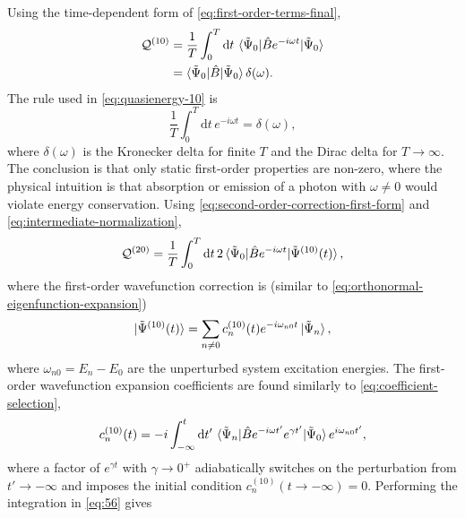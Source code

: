 \documentclass[%
class = book,%
crop = false,%
float = true,%
multi = true,%
preview = false,%
]{standalone}
\begin{document}
Using the time-dependent form of \eqref{eq:first-order-terms-final},
\begin{equation}
  \label{eq:quasienergy-10}
  \begin{aligned}
    \mathcal{Q}^{(10)} &= \frac{1}{T} \int_{0}^{T} \mathrm{d}t \, \braket{\tilde{\Psi}_{0}|\hat{B}e^{-i\omega t}|\tilde{\Psi}_{0}} \\
    &= \braket{\tilde{\Psi}_{0}|\hat{B}|\tilde{\Psi}_{0}} \delta(\omega).
\end{aligned}
\end{equation}
The rule used in \eqref{eq:quasienergy-10} is
\begin{equation}
  \label{eq:kronecker-delta-frequencies}
  \frac{1}{T} \int_{0}^{T} \mathrm{d}t \, e^{-i\omega t} = \delta(\omega),
\end{equation}
where \(\delta(\omega)\) is the Kronecker delta for finite \(T\) and the Dirac delta for \(T \rightarrow \infty\). The conclusion is that only static first-order properties are non-zero, where the physical intuition is that absorption or emission of a photon with \(\omega \neq 0\) would violate energy conservation. Using \eqref{eq:second-order-correction-first-form} and \eqref{eq:intermediate-normalization},
\begin{equation}
  \label{eq:quasienergy-20}
  \mathcal{Q}^{(20)} = \frac{1}{T} \int_{0}^{T} \mathrm{d}t \, 2\braket{\tilde{\Psi}_{0}|\hat{B}e^{-i\omega t}|\tilde{\Psi}^{(10)}(t)},
\end{equation}
where the first-order wavefunction correction is (similar to \eqref{eq:orthonormal-eigenfunction-expansion})
\begin{equation}
  \label{eq:first-order-wavefunction}
  \ket{\tilde{\Psi}^{(10)}(t)} = \sum_{n\neq 0} c_{n}^{(10)}(t) e^{-i\omega_{n0}t} \ket{\tilde{\Psi}_{n}},
\end{equation}
where \(\omega_{n0} = E_{n} - E_{0}\) are the unperturbed system excitation energies. The first-order wavefunction expansion coefficients are found similarly to \eqref{eq:coefficient-selection},
\begin{equation}
  \label{eq:56}
  c_{n}^{(10)}(t) = -i \int_{-\infty}^{t} \mathrm{d}t' \, \braket{\tilde{\Psi}_{n}|\hat{B}e^{-i\omega t'}e^{\gamma t'}|\tilde{\Psi}_{0}}e^{i\omega_{n0}t'},
\end{equation}
where a factor of \(e^{\gamma t}\) with \(\gamma \rightarrow 0^{+}\) adiabatically switches on the perturbation from \(t' \rightarrow -\infty\) and imposes the initial condition \(c_{n}^{(10)}(t \rightarrow -\infty) = 0\). Performing the integration in \eqref{eq:56} gives
\end{document}
